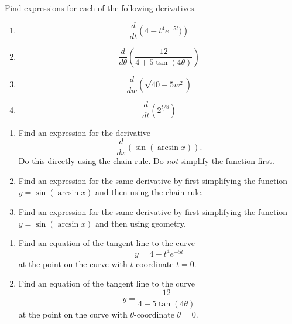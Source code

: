 \documentclass{ximera}
\begin{document}
\begin{question}  \label{Qujn5tyh6uu}
Find expressions for each of the following derivatives.

\begin{enumerate}
\item 
\[
\frac{d}{dt}\left( 4 - t^4 e^{-5t})  \right)
\]

\item 
\[
\frac{d}{d\theta}\left(  \frac{12}{4 + 5\tan (4\theta)}   \right)
\]

\item
\[
   \frac{d}{dw}\left(   \sqrt{40-5w^2}   \right)
\]

\item
\[
   \frac{d}{dt}\left(   2^{t/8}   \right)
\]

\end{enumerate}

\end{question}

\begin{question} \label{QPERERDfefr}
\begin{enumerate}
\item Find an expression for the derivative
\[
   \frac{d}{dx}\left( \sin (\arcsin x) \right) .
\]
Do this directly using the chain rule. Do \emph{not} simplify the function first.

\item Find an expression for the same derivative by first simplifying the function $y=\sin(\arcsin x)$ and then using the chain rule.

\item Find an expression for the same derivative by first simplifying the function $y=\sin(\arcsin x)$ and then using geometry.


\end{enumerate}
\end{question}


\begin{question} \label{Evchfhdhfhd}
\begin{enumerate}

\item Find an equation of the tangent line to the curve 
\[
  y =  4 - t^4 e^{-5t}
\]
at the point on the curve with $t$-coordinate $t=0$.

\item Find an equation of the tangent line to the curve 
\[
  y =   \frac{12}{4 + 5\tan (4\theta)}
\]
at the point on the curve with $\theta$-coordinate $\theta=0$.
\end{enumerate}
\end{question}
\end{document}
